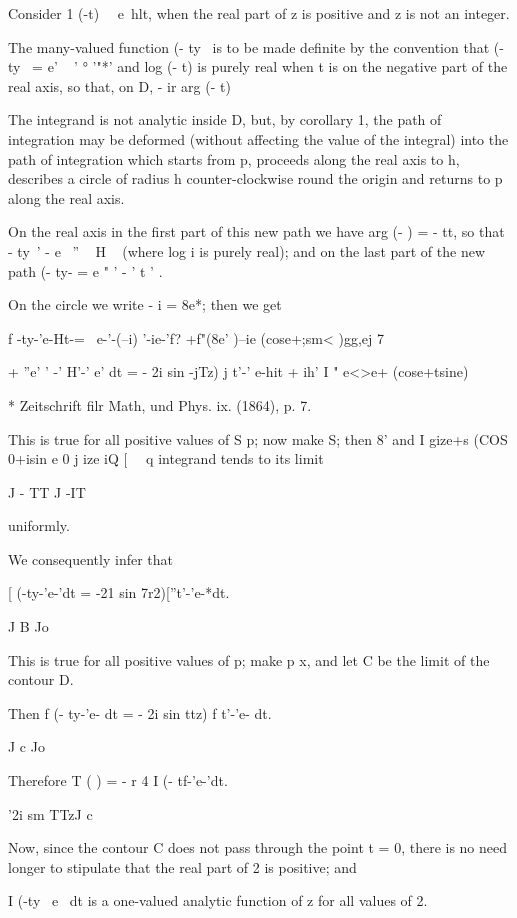 Consider 1 (-t)~~ e~hlt, when the real part of z is positive and z is
not an integer.

The many-valued function (- ty~ is to be made definite by the
convention that (- ty~ = e' ~ ' ° '"*' and log (- t) is purely real
when t is on the negative part of the real axis, so that, on D, - ir %
arg (- t) %

The integrand is not analytic inside D, but, by  corollary 1, the
path of integration may be deformed (without affecting the value of
the integral) into the path of integration which starts from p,
proceeds along the real axis to h, describes a circle of radius h
counter-clockwise round the origin and returns to p along the real
axis.

On the real axis in the first part of this new path we have arg (- ) =
- tt, so that - ty~' - e~ '' ~ H ~ (where log i is purely real); and
on the last part of the new path (- ty- = e " ' - ' t ' .

On the circle we write - i = 8e*; then we get

f -ty-'e-Ht-= \ e-'-(--i) '-ie-'f? +f"(8e' )--ie (cose+;sm< )gg,ej 7

+ ''e' ' -' H'-' e' dt = - 2i sin -jTz) j t'-' e-hit + ih' I " e<>e+
(cose+tsine) \

* Zeitschrift filr Math, und Phys. ix. (1864), p. 7.

%
%

This is true for all positive values of S p; now make S; then 8' and
I gize+s (COS 0+isin e 0 j ize iQ [ \ \ q integrand tends to its limit

J - TT J -IT

uniformly.

We consequently infer that

[ (-ty-'e-'dt = -21 sin 7r2)[''t'-'e-*dt.

J B Jo

This is true for all positive values of p; make p x, and let C be
the limit of the contour D.

Then f (- ty-'e- dt = - 2i sin ttz) f t'-'e- dt.

J c Jo

Therefore T ( ) = - r 4 I (- tf-'e-'dt.

'2i sm TTzJ c

Now, since the contour C does not pass through the point t = 0, there
is no need longer to stipulate that the real part of 2 is positive;
and

I (-ty~ e~ dt is a one-valued analytic function of z for all values of
2.

